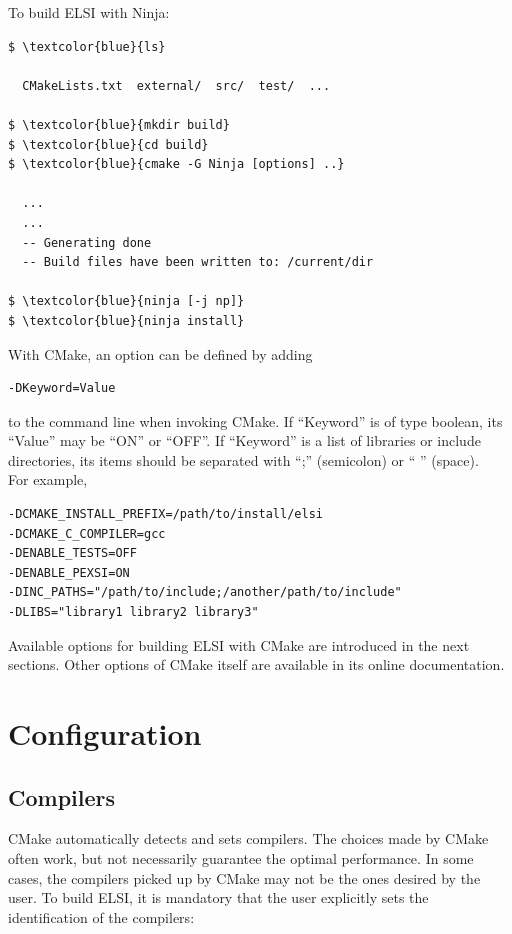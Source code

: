 \documentclass{report}
\begin{document}
To build ELSI with Ninja:\\

\begin{Verbatim}[commandchars=\\\{\}]
$ \textcolor{blue}{ls}

  CMakeLists.txt  external/  src/  test/  ...

$ \textcolor{blue}{mkdir build}
$ \textcolor{blue}{cd build}
$ \textcolor{blue}{cmake -G Ninja [options] ..}

  ...
  ...
  -- Generating done
  -- Build files have been written to: /current/dir

$ \textcolor{blue}{ninja [-j np]}
$ \textcolor{blue}{ninja install}
\end{Verbatim}

With CMake, an option can be defined by adding\\

\begin{verbatim}
-DKeyword=Value
\end{verbatim}

to the command line when invoking CMake.  If ``Keyword'' is of type boolean, its ``Value'' may be ``ON'' or ``OFF''.  If ``Keyword'' is a list of libraries or include directories, its items should be separated with ``;'' (semicolon) or `` '' (space).\\

For example,\\

\begin{verbatim}
-DCMAKE_INSTALL_PREFIX=/path/to/install/elsi
-DCMAKE_C_COMPILER=gcc
-DENABLE_TESTS=OFF
-DENABLE_PEXSI=ON
-DINC_PATHS="/path/to/include;/another/path/to/include"
-DLIBS="library1 library2 library3"
\end{verbatim}

Available options for building ELSI with CMake are introduced in the next sections.  Other options of CMake itself are available in its online documentation.\\

\section{Configuration}
\label{sec:config}
\subsection{Compilers}
\label{subsec:config_compilers}
CMake automatically detects and sets compilers.  The choices made by CMake often work, but not necessarily guarantee the optimal performance.  In some cases, the compilers picked up by CMake may not be the ones desired by the user.  To build ELSI, it is mandatory that the user explicitly sets the identification of the compilers:\\
\end{document}
